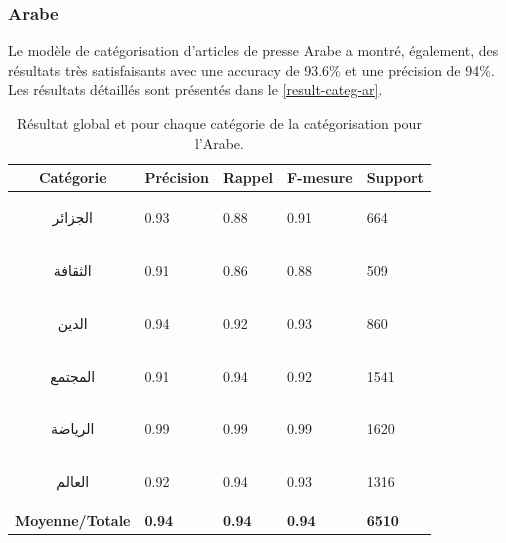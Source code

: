     \subsubsection{Arabe}
    Le modèle de catégorisation d'articles de presse Arabe a montré, également, des résultats très satisfaisants avec une accuracy de 93.6\% et une précision de 94\%. Les résultats détaillés sont présentés dans le \autoref{result-categ-ar}.
    \begin{table}[H]
        \begin{center}
            \begin{tabular}{|c|C{2cm}|C{2cm}|C{2cm}|C{2cm}|}
                \hline
                \textbf{Catégorie} &  \textbf{Précision} &  \textbf{Rappel} &  \textbf{F-mesure} &  \textbf{Support} \\
                \hline
                \begin{arab}الجزائر\end{arab} & 0.93 & 0.88 & 0.91 & 664 \\
                \begin{arab}الثقافة\end{arab} & 0.91 & 0.86 & 0.88 & 509 \\
                \begin{arab}الدين\end{arab} & 0.94 & 0.92 & 0.93 & 860 \\
                \begin{arab}المجتمع\end{arab} & 0.91 & 0.94 & 0.92 & 1541 \\
                \begin{arab}الرياضة\end{arab} & 0.99 & 0.99 & 0.99 & 1620 \\
                \begin{arab}العالم\end{arab} & 0.92 & 0.94 & 0.93 & 1316 \\                      
                \textbf{Moyenne/Totale} & \textbf{0.94} & \textbf{0.94} & \textbf{0.94} & \textbf{6510} \\
                \hline
            \end{tabular}
        \end{center}
        \caption{Résultat global et pour chaque catégorie de la catégorisation pour l'Arabe.}
        \label{result-categ-ar}
    \end{table}

